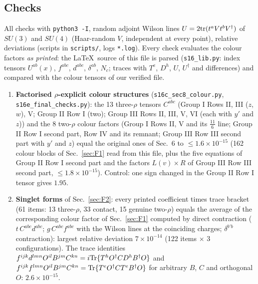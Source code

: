 \documentclass[9pt]{article}
\numberwithin{equation}{section}
\begin{document}
\subsection{Checks}\label{sec:F3}
\noindent All checks with \texttt{python3 -I}, random adjoint Wilson lines $U=2{\rm tr}(t^{a}Vt^{b}V^{\dagger})$ of $SU(3)$ and $SU(4)$ (Haar-random $V$, independent at every point), relative deviations (scripts in \texttt{scripts/}, logs \texttt{*.log}). Every check evaluates the colour factors \emph{as printed}: the \LaTeX\ source of this file is parsed (\texttt{s16\_lib.py}: index tensors $U^{ab}(x)$, $f^{abc}$, $d^{abc}$, $\delta^{ab}$, $N_{c}$; traces with $T^{e}$, $D^{h}$, $U$, $U^{\dagger}$ and differences) and compared with the colour tensors of our verified file.
\begin{enumerate}
\item \textbf{Factorised $\rho$-explicit colour structures} (\texttt{s16c\_sec8\_colour.py}, \texttt{s16e\_final\_checks.py}): the 13 three-$\rho$ tensors $C^{abc}$ (Group I Rows II, III ($z$, $w$), V; Group II Row I (two); Group III Rows II, III, V, VI (each with $y'$ and $z$)) and the 8 two-$\rho$ colour factors (Group I Rows II, V and its $\frac{11}{6}$ line; Group II Row I second part, Row IV and its remnant; Group III Row III second part with $y'$ and $z$) equal the original ones of Sec.~6 to $\le1.6\times10^{-15}$ (162 colour blocks of Sec.~\ref{sec:F1} read from this file, plus the five equations of Group II Row I second part and the factors $L(v)\times R$ of Group III Row III second part, $\le1.8\times10^{-15}$). Control: one sign changed in the Group II Row I tensor gives $1.95$.
\item \textbf{Singlet forms} of Sec.~\ref{sec:F2}: every printed coefficient times trace bracket (61 items: 13 three-$\rho$, 33 contact, 15 genuine two-$\rho$) equals the average of the corresponding colour factor of Sec.~\ref{sec:F1} computed by direct contraction ($t\,C^{abc}d^{abc}$; $g\,C^{abc}f^{abc}$ with the Wilson lines at the coinciding charges; $\delta^{b'b}$ contraction): largest relative deviation $7\times10^{-14}$ (122 items $\times$ 3 configurations). The trace identities $f^{ijk}d^{lmn}O^{il}B^{jm}C^{kn}=i{\rm Tr}\{T^{h}O^{\dagger}CD^{h}B^{\dagger}O\}$ and $f^{ijk}f^{lmn}O^{il}B^{jm}C^{kn}={\rm Tr}\{T^{e}O^{\dagger}CT^{e}B^{\dagger}O\}$ for arbitrary $B$, $C$ and orthogonal $O$: $2.6\times10^{-15}$.

\end{enumerate}
\end{document}
